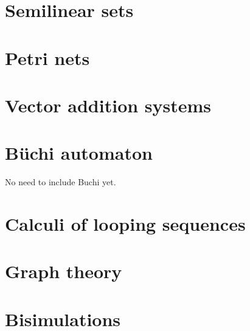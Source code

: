 
\section{Semilinear sets} %
\label{sec:semilinear_sets}



\section{Petri nets} %
\label{sec:petri_nets}



\section{Vector addition systems} %
\label{sec:vector_addition_systems}



\section{Büchi automaton} %
\label{sec:buchi_automaton}
No need to include Buchi yet.

\section{Calculi of looping sequences} %
\label{sec:calculi_of_looping_sequences}



\section{Graph theory} %
\label{sec:graph_theory}



\section{Bisimulations} %
\label{sec:bisimulations}

